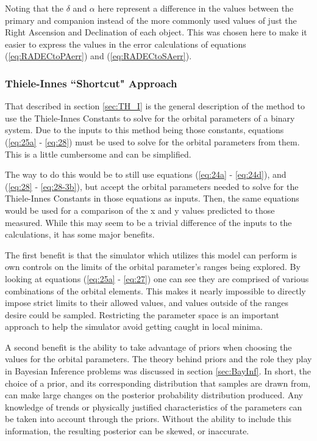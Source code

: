 \documentclass[12pt,preprint]{aastex}
\begin{document}
Noting that the $\delta$ and $\alpha$ here represent a difference in the values between the primary and companion instead of the more commonly used values of just the Right Ascension and Declination of each object.  This was chosen here to make it easier to express the values in the error calculations of equations (\ref{eq:RADECtoPAerr}) and (\ref{eq:RADECtoSAerr}).

\clearpage
\subsubsection{Thiele-Innes ``Shortcut" Approach}\label{sec:TH_I_shortcut}

That described in section \ref{sec:TH_I} is the general description of the method to use the Thiele-Innes Constants to solve for the orbital parameters of a binary system.  Due to the inputs to this method being those constants, equations (\ref{eq:25a} - \ref{eq:28}) must be used to solve for the orbital parameters from them.  This is a little cumbersome and can be simplified.

The way to do this would be to still use equations (\ref{eq:24a} - \ref{eq:24d}), and (\ref{eq:28} - \ref{eq:28-3b}), but accept the orbital parameters needed to solve for the Thiele-Innes Constants in those equations as inputs.  Then, the same equations would be used for a comparison of the x and y values predicted to those measured.  While this may seem to be a trivial difference of the inputs to the calculations, it has some major benefits.

The first benefit is that the simulator which utilizes this model can perform is own controls on the limits of the orbital parameter's ranges being explored.  By looking at equations (\ref{eq:25a} - \ref{eq:27}) one can see they are comprised of various combinations of the orbital elements.  This makes it nearly impossible to directly impose strict limits to their allowed values, and values outside of the ranges desire could be sampled.  Restricting the parameter space is an important approach to help the simulator avoid getting caught in local minima.

A second benefit is the ability to take advantage of priors when choosing the values for the orbital parameters.  The theory behind priors and the role they play in Bayesian Inference problems was discussed in section \ref{sec:BayInf}.  In short, the choice of a prior, and its corresponding distribution that samples are drawn from, can make large changes on the posterior probability distribution produced.  Any knowledge of trends or physically justified characteristics of the parameters can be taken into account through the priors.  Without the ability to include this information, the resulting posterior can be skewed, or inaccurate.
\end{document}

